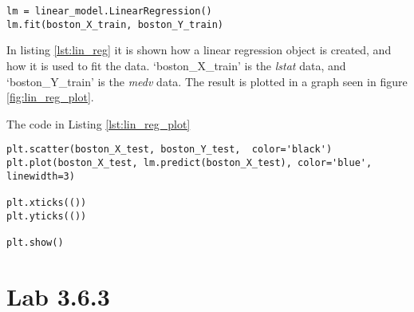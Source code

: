 \lstset{}
\begin{lstlisting}[caption={Python Linear Regression function}, label=lst:lin_reg, mathescape=true]
lm = linear_model.LinearRegression()
lm.fit(boston_X_train, boston_Y_train)
\end{lstlisting}

In listing \ref{lst:lin_reg} it is shown how a linear regression object is created, and how it is used to fit the data. ‘boston\_X\_train’ is the \emph{lstat} data, and ‘boston\_Y\_train’ is the \emph{medv} data.
The result is plotted in a graph seen in figure \ref{fig:lin_reg_plot}.


The code in Listing \ref{lst:lin_reg_plot}
\begin{lstlisting}[caption={Python Plotting of Linear Regression function}, label=lst:lin_reg_plot, mathescape=true]
plt.scatter(boston_X_test, boston_Y_test,  color='black')
plt.plot(boston_X_test, lm.predict(boston_X_test), color='blue',
linewidth=3)

plt.xticks(())
plt.yticks(())

plt.show()
\end{lstlisting}
 

\section{Lab 3.6.3}

